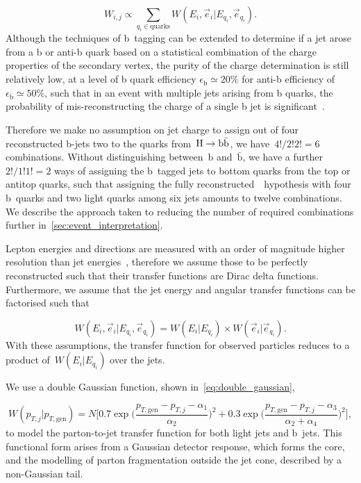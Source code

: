 \begin{equation}
\label{eq:tf_combination_sum}
W_{i,j} \propto \sum_{q_i \in \mathrm{quarks}} W(E_i, \vec{e}_i | E_{q_i}, \vec{e}_{q_i}).
\end{equation}
Although the techniques of b~tagging can be extended to determine if a jet arose from a b or anti-b quark based on a statistical combination of the charge properties of the secondary vertex, the purity of the charge determination is still relatively low, at a level of b quark efficiency $\epsilon_{\mathrm{b}} \simeq 20\%$ for anti-b efficiency of $\epsilon_{\mathrm{\bar{b}}} \simeq 50\%$, such that in an event with multiple jets arising from b quarks, the probability of mis-reconstructing the charge of a single b jet is significant~\cite{ATL-PHYS-PUB-2015-040}.

Therefore we make no assumption on jet charge to assign out of four reconstructed b-jets two to the quarks from~$\mathrm{H} \rightarrow \mathrm{b}\bar{\mathrm{b}}$, we have~$4!/2!2! = 6$ combinations. Without distinguishing between~$\mathrm{b}$ and~$\bar{\mathrm{b}}$, we have a further~$2!/1!1! = 2$ ways of assigning the b~tagged jets to bottom quarks from the top or antitop quarks, such that assigning the fully reconstructed~\ttHbb~hypothesis with four b~quarks and two light quarks among six jets amounts to twelve combinations. We describe the approach taken to reducing the number of required combinations further in~\cref{sec:event_interpretation}.

Lepton energies and directions are measured with an order of magnitude higher resolution than jet energies~\cite{CMS-PRF-14-001}, therefore we assume those to be perfectly reconstructed such that their transfer functions are Dirac delta functions.
Furthermore, we assume that the jet energy and angular transfer functions can be factorised such that

\begin{equation}
W(E_i, \vec{e}_i | E_{q_i}, \vec{e}_{q_i}) = W(E_i | E_{q_i}) \times W(\vec{e}_i | \vec{e}_{q_i}).
\end{equation}
With these assumptions, the transfer function for observed particles reduces to a product of~$W(E_i | E_{q_i})$ over the jets.

We use a double Gaussian function, shown in~\cref{eq:double_gaussian},

\begin{equation}
\label{eq:double_gaussian}
W(p_{T,j} | p_{T,\mathrm{gen}}) = N \biggl[0.7\exp{\biggl(\frac{p_{T,\mathrm{gen}} - p_{T,j} - \alpha_1}{\alpha_2}\biggr)^2} + 0.3\exp{\biggl(\frac{p_{T,\mathrm{gen}} - p_{T,j} - \alpha_3}{\alpha_2+\alpha_4}\biggr)^2}\biggr],
\end{equation}
to model the parton-to-jet transfer function for both light jets and b~jets. This functional form arises from a Gaussian detector response, which forms the core, and the modelling of parton fragmentation outside the jet cone, described by a non-Gaussian tail.

